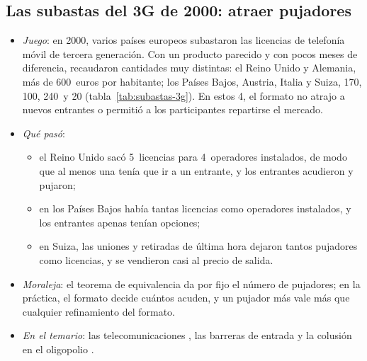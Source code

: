 \documentclass[11pt]{article}
\begin{document}
\subsection*{Las subastas del 3G de 2000: atraer pujadores}

\begin{itemize}
\item \emph{Juego}: en 2000, varios países europeos subastaron las licencias de telefonía móvil de tercera generación. Con un producto parecido y con pocos meses de diferencia, recaudaron cantidades muy distintas: el Reino Unido y Alemania, más de 600~euros por habitante; los Países Bajos, Austria, Italia y Suiza, 170, 100, 240~y 20\nocite{Klemperer2002WhatReallyMatters} (tabla~\ref{tab:subastas-3g}). En estos 4, el formato no atrajo a nuevos entrantes o permitió a los participantes repartirse el mercado.
\item \emph{Qué pasó}:
  \begin{itemize}
  \item el Reino Unido sacó 5~licencias para 4~operadores instalados, de modo que al menos una tenía que ir a un entrante, y los entrantes acudieron y pujaron\nocite{BinmoreKlemperer2002Biggest};
  \item en los Países Bajos había tantas licencias como operadores instalados, y los entrantes apenas tenían opciones;
  \item en Suiza, las uniones y retiradas de última hora dejaron tantos pujadores como licencias, y se vendieron casi al precio de salida\nocite{Klemperer2002WhatReallyMatters}.
  \end{itemize}
\item \emph{Moraleja}: el teorema de equivalencia da por fijo el número de pujadores; en la práctica, el formato decide cuántos acuden, y un pujador más vale más que cualquier refinamiento del formato\nocite{BulowKlemperer1996Auctions}.
\item \emph{En el temario}: las telecomunicaciones , las barreras de entrada  y la colusión en el oligopolio .
\end{itemize}
\end{document}

